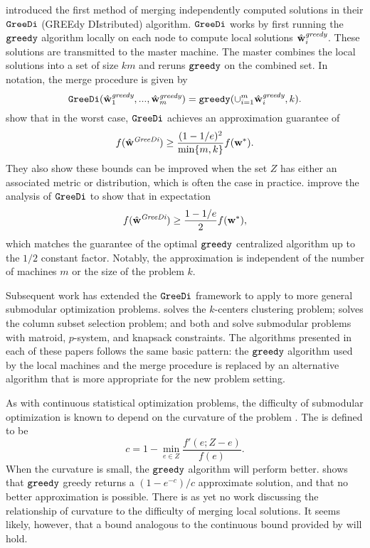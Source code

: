 \documentclass[thesis.tex]{subfiles}
\newcommand{\greedy}{\mkprocedure{greedy}}
\newcommand{\GreeDi}{\mkprocedure{GreeDi}}
\newcommand{\wgreedy}{\hat\w^\textit{greedy}}
\newcommand{\wGreeDi}{\hat\w^\textit{GreeDi}}
\begin{document}
\cite{mirzasoleiman2013distributed} introduced the first method of merging independently computed solutions in their $\GreeDi$ (GREEdy DIstributed) algorithm.
$\GreeDi$ works by first running the $\greedy$ algorithm locally on each node to compute local solutions $\wgreedy_i$.
These solutions are transmitted to the master machine.
The master combines the local solutions into a set of size $km$ and reruns $\greedy$ on the combined set.
In notation, the merge procedure is given by
\begin{equation}
    \GreeDi(\wgreedy_1,...,\wgreedy_m) = \greedy(\cup_{i=1}^m\wgreedy_i,k)
    .
\end{equation}
\cite{mirzasoleiman2013distributed} show that in the worst case,
$\GreeDi$ achieves an approximation guarantee of 
\begin{equation}
    f(\wGreeDi) \ge \frac{(1-1/e)^2}{\min\{m,k\}} f(\wstar)
    .
\end{equation}
They also show these bounds can be improved when the set $Z$ has either an associated metric or distribution,
which is often the case in practice.
\citet{barbosa2015power} improve the analysis of $\GreeDi$ to show that in expectation
\begin{equation}
    f(\wGreeDi) \ge \frac {1-1/e}{2} f(\wstar)
    ,
\end{equation}
which matches the guarantee of the optimal $\greedy$ centralized algorithm up to the $1/2$ constant factor.
Notably, the approximation is independent of the number of machines $m$ or the size of the problem $k$.

Subsequent work has extended the $\GreeDi$ framework to apply to more general submodular optimization problems.
\cite{malkomes2015fast} solves the $k$-centers clustering problem;
\cite{bhaskara2016greedy} solves the column subset selection problem;
and both \cite{barbosa2016new} and \citet{mirzasoleiman2016distributed} solve submodular problems with matroid, $p$-system, and knapsack constraints.
The algorithms presented in each of these papers follows the same basic pattern:
the $\greedy$ algorithm used by the local machines and the merge procedure is replaced by an alternative algorithm that is more appropriate for the new problem setting.

As with continuous statistical optimization problems,
the difficulty of submodular optimization is known to depend on the curvature of the problem
\citep{vondrak2010submodularity}.
The  is defined to be
\begin{equation}
    c = 1 - \min_{e\in Z} \frac{f'(e;Z-e)}{f(e)}
    .
\end{equation}
When the curvature is small, the $\greedy$ algorithm will perform better.
\citet{vondrak2010submodularity} shows that $\greedy$ greedy returns a $(1-e^{-c})/c$ approximate solution,
and that no better approximation is possible.
There is as yet no work discussing the relationship of curvature to the difficulty of merging local solutions.
It seems likely, however, that a bound analogous to the continuous bound provided by \citet{liu2014distributed} will hold.
\end{document}

